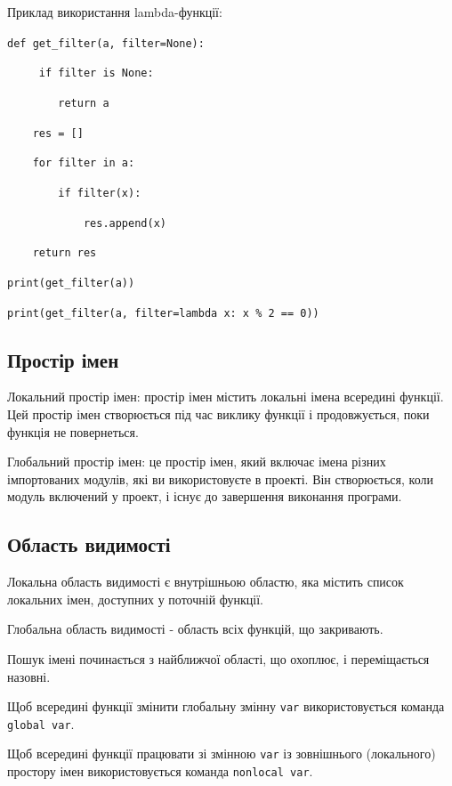 \begin{frame}
Приклад використання lambda-функції:

\texttt{def get\_filter(a, filter=None):}

\texttt{~~~~ if filter is None:}

\texttt{~~~~~~~~return a}

\texttt{~~~~res = []}

\texttt{~~~~for filter in a:}

\texttt{~~~~~~~~if filter(x):}

\texttt{~~~~~~~~~~~~res.append(x)}

\texttt{~~~~return res}

\vspace*{0.8cm}

\texttt{print(get\_filter(a))}

\texttt{print(get\_filter(a, filter=lambda x: x \% 2 == 0))}
\end{frame}

\subsection{Простір імен} 
\begin{frame}
Локальний простір імен: простір імен містить локальні імена всередині функції. Цей простір імен створюється під час виклику функції і продовжується, поки функція не повернеться.

Глобальний простір імен: це простір імен, який включає імена різних імпортованих модулів, які ви використовуєте в проекті. Він створюється, коли модуль включений у проект, і існує до завершення виконання програми.

\end{frame}

\subsection{Область видимості} 
\begin{frame}
Локальна область видимості є внутрішньою областю, яка містить список локальних імен, доступних у поточній функції.

Глобальна область  видимості - область всіх функцій, що закривають. 

Пошук імені починається з найближчої області, що охоплює, і переміщається назовні.

Щоб всередині функції змінити глобальну змінну \texttt{var} використовується команда \texttt{global var}.

Щоб всередині функції працювати зі змінною \texttt{var} із зовнішнього (локального) простору імен використовується команда \texttt{nonlocal var}.

\end{frame}
